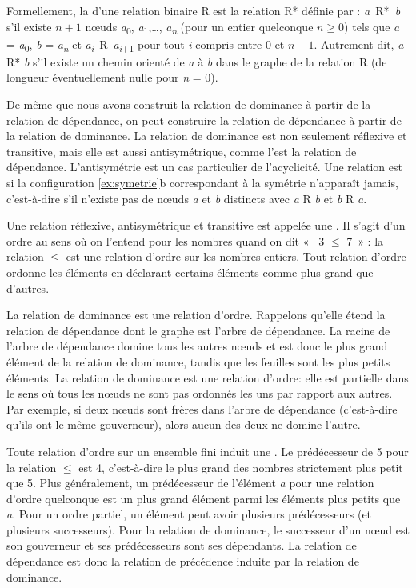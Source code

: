 {    Formellement, la  d’une relation binaire R est la relation R* définie par : \textit{a~}R*\textit{~b} s’il existe $n+1$ nœuds \textit{a}\textsubscript{0}, \textit{a}\textsubscript{1},…, \textit{a\textsubscript{n}} (pour un entier quelconque $n \geq 0$) tels que \textit{a} = \textit{a}\textsubscript{0}, \textit{b} = \textit{a\textsubscript{n}} et \textit{a\textsubscript{i}}~R~\textit{a\textsubscript{i}}\textsubscript{+1} pour tout \textit{i} compris entre 0 et $n-1$. Autrement dit, \textit{a} R* \textit{b} s’il existe un chemin orienté de \textit{a} à \textit{b} dans le graphe de la relation R (de longueur éventuellement nulle pour \textit{n} = 0).

    De même que nous avons construit la relation de dominance à partir de la relation de dépendance, on peut construire la relation de dépendance à partir de la relation de dominance. La relation de dominance est non seulement réflexive et transitive, mais elle est aussi antisymétrique, comme l’est la relation de dépendance. L’antisymétrie est un cas particulier de l’acyclicité. Une relation est  si la configuration \ref{ex:symetrie}b correspondant à la symétrie n’apparaît jamais, c’est-à-dire s’il n’existe pas de nœuds \textit{a} et \textit{b} distincts avec \textit{a} R \textit{b} et \textit{b} R \textit{a}.

    Une relation réflexive, antisymétrique et transitive est appelée une . Il s’agit d’un ordre au sens où on l’entend pour les nombres quand on dit «~ 3 ${\leq}$ 7~» : la relation ${\leq}$ est une relation d’ordre sur les nombres entiers. Tout relation d’ordre ordonne les éléments en déclarant certains éléments comme plus grand que d’autres.

    La relation de dominance est une relation d’ordre. Rappelons qu’elle étend la relation de dépendance dont le graphe est l’arbre de dépendance. La racine de l'arbre de dépendance domine tous les autres nœuds et est donc le plus grand élément de la relation de dominance, tandis que les feuilles sont les plus petits éléments. La relation de dominance est une relation d’ordre: elle est partielle dans le sens où tous les nœuds ne sont pas ordonnés les uns par rapport aux autres. Par exemple, si deux nœuds sont frères dans l’arbre de dépendance (c’est-à-dire qu’ils ont le même gouverneur), alors aucun des deux ne domine l’autre.

    Toute relation d’ordre sur un ensemble fini induit une . Le prédécesseur de 5 pour la relation ${\leq}$ est 4, c’est-à-dire le plus grand des nombres strictement plus petit que 5. Plus généralement, un prédécesseur de l’élément \textit{a} pour une relation d’ordre quelconque est un plus grand élément parmi les éléments plus petits que \textit{a}. Pour un ordre partiel, un élément peut avoir plusieurs prédécesseurs (et plusieurs successeurs). Pour la relation de dominance, le successeur d’un nœud est son gouverneur et ses prédécesseurs sont ses dépendants. La relation de dépendance est donc la relation de précédence induite par la relation de dominance.

}
